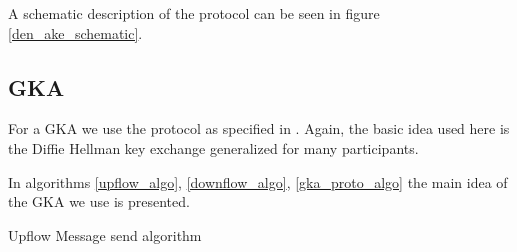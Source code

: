 \documentclass[]{article}
\begin{document}
A schematic description of the protocol can be seen in figure \ref{den_ake_schematic}.

\subsection{GKA}

For a GKA we use the protocol as specified in \cite{mpenc}.
Again, the basic idea used here is the Diffie Hellman key exchange generalized for many participants.

In algorithms \ref{upflow_algo}, \ref{downflow_algo}, \ref{gka_proto_algo} the main idea of the GKA we use is presented.


\begin{algorithm}[h]
	\caption{Upflow Message send algorithm}
	\label{upflow_algo}
\end{algorithm}
\end{document}
